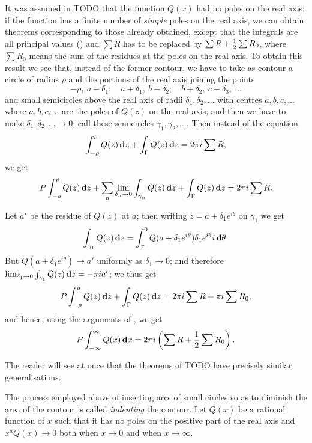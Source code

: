 It was assumed in TODO that the function $Q(x)$ had no
poles on the real axis; if the function has a finite number of \emph{simple}
poles on the real axis, we can obtain theorems corresponding to those
already obtained, except that the integrals are all principal values
() and $\sum R$ has to be replaced by
$\sum R + \frac{1}{2} \sum R_{0}$, where $\sum R_{0}$ means the
sum of the residues at the poles on the real axis. To obtain this
result we see that, instead of the former contour, we have to take as
contour a circle of radius $\rho$ and the portions of the real axis joining
the points
$$
-\rho, \ a-\delta_{1};
\quad
a+\delta_{1}, \ b-\delta_{2};
\quad
b+\delta_{2}, \ c-\delta_{3},
\ \ldots
$$
and small semicircles above the real axis of radii
$\delta_{1},\delta_{2},\ldots$ with
centres $a, b, c, \ldots$ where $a, b, c, \ldots$ are the poles of
$Q(z)$ on the real axis; and then we have to make
$\delta_{1}, \delta_{2}, \ldots \rightarrow 0$;
call these semicircles $\gamma_{1},\gamma_{2},\ldots$.
Then instead of the equation
$$
\int_{-\rho}^{\rho} Q(z) \, \mathbf{d} z
+
\int_{\Gamma} Q(z) \, \mathbf{d} z
=
2 \pi i \sum R,
$$
we get
$$
P \int_{-\rho}^{\rho} Q(z) \, \mathbf{d} z
+
\sum_{n}
\lim_{\delta_{n} \rightarrow 0}
\int_{\gamma_{n}} Q(z) \, \mathbf{d} z
+
\int_{\Gamma} Q(z) \, \mathbf{d} z
=
2 \pi i \sum R.
$$

Let $a'$ be the residue of $Q(z)$ at $a$; then writing
$z = a + \delta_{1} e^{i\theta}$ on $\gamma_{1}$ we get
$$
\int_{\gamma_{1}} Q(z) \, \mathbf{d} z
=
\int_{\pi}^{0}
Q(a + \delta_{1} e^{i\theta})
\delta_{1} e^{i\theta} i \, \mathbf{d} \theta.
$$
But $Q(a + \delta_{1} e^{i\theta}) \rightarrow a'$
uniformly as $\delta_{1} \rightarrow 0$; and therefore
$
\lim_{\delta_{1} \rightarrow 0} \int_{\gamma_{1}} Q(z) \, \mathbf{d} z
=
- \pi i a'
$;
we thus get
$$
P \int_{-\rho}^{\rho} Q(z) \, \mathbf{d} z
+
\int_{\Gamma} Q(z) \, \mathbf{d} z
=
2 \pi i \sum R
+
\pi i \sum R_{0},
$$
and hence, using the arguments of , we get
$$
P \int_{-\infty}^{\infty} Q(x) \, \mathbf{d} x
=
2 \pi i \left(  \sum R + \frac{1}{2} \sum R_{0}  \right).
$$

The reader will see at once that the theorems of TODO have
precisely similar generalisations.

The process employed above of inserting arcs of small circles so as to
diminish the area of the contour is called \emph{indenting} the contour.
Let $Q(x)$ be a rational function of $x$ such that it has no poles on the
positive part of the real axis and
$x^{a} Q(x) \rightarrow 0$ both when $x \rightarrow 0$ and when
$x \rightarrow \infty$.

